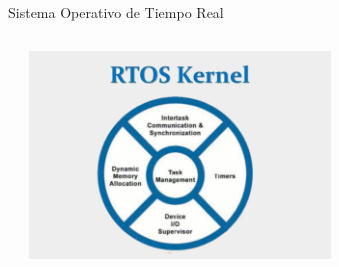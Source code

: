 \documentclass[8pt,aspectratio=169,compress]{beamer}
\begin{document}
\begin{frame}{Sistema Operativo de Tiempo Real}
\begin{columns}[onlytextwidth,T]
\begin{itemize}
\bigskip
\end{itemize}
      \column{70mm}
    \includegraphics[width=80mm]{images/rtos.jpg}

    \end{columns}

\end{frame}
\end{document}
